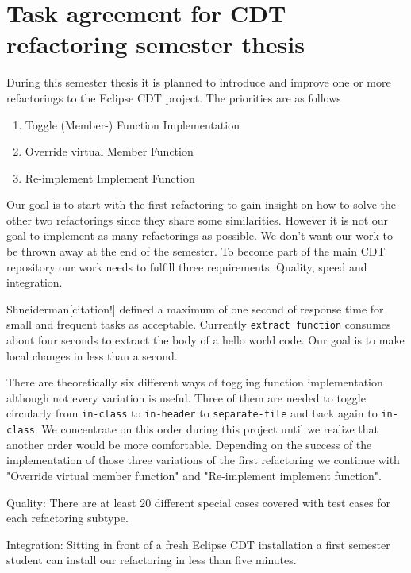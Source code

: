 \documentclass[a4paper,10pt]{scrreprt}
\begin{document}
\section*{Task agreement for CDT refactoring semester thesis}

During this semester thesis it is planned to introduce and improve one or more refactorings to the Eclipse CDT project. The priorities are as follows

\begin{enumerate}
\item Toggle (Member-) Function Implementation
\item Override virtual Member Function
\item Re-implement Implement Function
\end{enumerate}

Our goal is to start with the first refactoring to gain insight on how to solve the other two refactorings since they share some similarities. However it is not our goal to implement as many refactorings as possible. We don't want our work to be thrown away at the end of the semester. To become part of the main CDT repository our work needs to fulfill three requirements: Quality, speed and integration. 

Shneiderman[citation!] defined a maximum of one second of response time for small and frequent tasks as acceptable. Currently \texttt{extract function} consumes about four seconds to extract the body of a hello world code. Our goal is to make local changes in less than a second. 

There are theoretically six different ways of toggling function implementation although not every variation is useful. Three of them are needed to toggle circularly from \texttt{in-class} to \texttt{in-header} to \texttt{separate-file} and back again to \texttt{in-class}. We concentrate on this order during this project until we realize that another order would be more comfortable. Depending on the success of the implementation of those three variations of the first refactoring we continue with "Override virtual member function" and "Re-implement implement function". 

Quality: There are at least 20 different special cases covered with test cases for each refactoring subtype.

Integration: Sitting in front of a fresh Eclipse CDT installation a first semester student can install our refactoring in less than five minutes.
\end{document}
